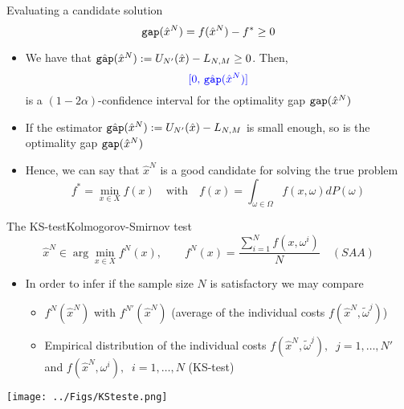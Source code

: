 \begin{frame}{Evaluating a candidate solution}
\[
{\tt gap}(\hat x^N) = f(\hat x^N)-f^*\geq 0
\]

\begin{itemize}
\item We have that
$
\hat{{\tt gap}}(\hat x^N):= U_{N'}(\hat x) - L_{N,M}\geq 0
$. Then,
\[
{\color{blue}[0,\,\hat{{\tt gap}}(\hat x^N)]}
\]
is a $(1-2\alpha)$-confidence interval for the optimality gap  ${\tt gap} (\hat x^N)$

\pula
\item If the estimator $\hat{{\tt gap}}(\hat x^N):= U_{N'}(\hat x) - L_{N,M}$ is small enough, so is the optimality gap  ${\tt gap}(\hat x^N)$
\pula
\item Hence, we can say that $\hat x^N$ is a good candidate for solving the true problem
\[
f^*=\min_{x \in X} f(x)\quad \mbox{with}\quad f(x)=\int_{\omega \in \Omega} f(x,\omega)dP(\omega) 
\]
\end{itemize}
\end{frame}



\begin{frame}{The KS-test}{Kolmogorov-Smirnov test}
\[
\hat x^N \in \arg \min_{x \in X} f^N(x), \quad \quad f^N(x)=\frac{\sum_{i=1}^N f(x,\omega^i)}{N}\quad (SAA)
\]

\begin{itemize}
\item In order to infer if the sample size $N$  is satisfactory we may compare
\pula
\begin{itemize}
\item $f^N(\hat x^N)$ with $f^{N'}(\hat x^N)$   (average of the individual costs $f(\hat x^N, \tilde \omega^j)$)
\pula

\item Empirical distribution of the individual costs  $f(\hat x^N, \tilde \omega^j),\;\;j=1,\ldots,N'$ and $f(\hat x^N,\omega^i),\;\;i=1,\ldots,N$ (KS-test)
\end{itemize}
\end{itemize}

\begin{center}
\texttt{[image: ../Figs/KSteste.png]} {}
\end{center}
 \end{frame} 
 
